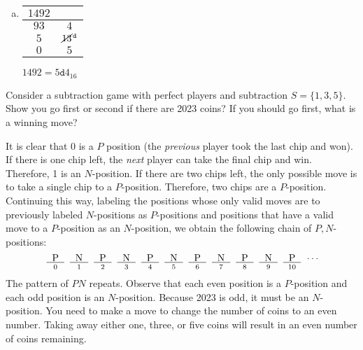 \documentclass[12pt,letterpaper]{exam}
\newcommand{\nim}[2]{\underset{#1}{\hspace{0.1cm}\underline{\hspace{0.2cm} \text{#2} \hspace{0.2cm}} \hspace{0.1cm}}}
\begin{document}
\begin{questions}
\begin{enumerate}[(a)]
\item \phantom{.}\par
	\begin{table}[h]
	\centering
	\begin{tabular}{c|c}
	$1492$ & \cellcolor[HTML]{9B9B9B} \\ \hline
	$93$ & $4$ \\
	$5$ & $\cancel{13}^\texttt{\,d}$ \\
	$0$ & $5$
	\end{tabular} \pvspace{0.75cm}
	$1492= 5 \texttt{d}4_{16}$
	\end{table} 
\end{enumerate}



\newpage
\question[10] Consider a subtraction game with perfect players and subtraction $S= \{ 1, 3, 5 \}$. Show you go first or second if there are 2023 coins? If you should go first, what is a winning move? \pspace

\sol It is clear that $0$ is a $P$ position (the \textit{previous} player took the last chip and won). If there is one chip left, the \textit{next} player can take the final chip and win. Therefore, 1 is an $N$-position. If there are two chips left, the only possible move is to take a single chip to a $P$-position. Therefore, two chips are a $P$-position. Continuing this way, labeling the positions whose only valid moves are to previously labeled $N$-positions as $P$-positions and positions that have a valid move to a $P$-position as an $N$-position, we obtain the following chain of $P, N$-positions: 
	\[
	\nim{0}{P} \nim{1}{N} \nim{2}{P} \nim{3}{N} \nim{4}{P} \nim{5}{N} \nim{6}{P} \nim{7}{N} \nim{8}{P} \nim{9}{N} \nim{10}{P} \, \cdots
	\]
The pattern of $PN$ repeats. Observe that each even position is a $P$-position and each odd position is an $N$-position. Because 2023 is odd, it must be an $N$-position. You need to make a move to change the number of coins to an even number. Taking away either one, three, or five coins will result in an even number of coins remaining. 




\end{questions}
\end{document}
